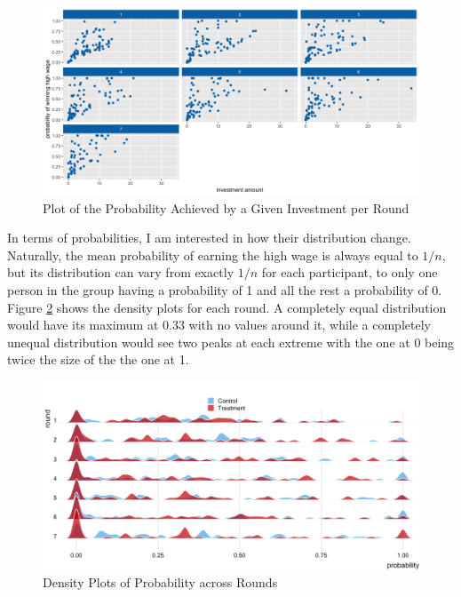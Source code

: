 \begin{figure}
    \centering
    \includegraphics[width=\textwidth]{graphs/invest_prob_point.png}
    \caption{Plot of the Probability Achieved by a Given Investment per Round}
    \label{fig:invest_prob_point}
\end{figure}

In terms of probabilities, I am interested in how their distribution change. Naturally, the mean probability of earning the high wage is always equal to $1/n$, but its distribution can vary from exactly $1/n$ for each participant, to only one person in the group having a probability of 1 and all the rest a probability of 0. Figure \ref{fig:dens_prob} shows the density plots for each round. A completely equal distribution would have its maximum at 0.33 with no values around it, while a completely unequal distribution would see two peaks at each extreme with the one at 0 being twice the size of the the one at 1.\\

\begin{figure}[H]
    \centering
    \includegraphics[width = \textwidth]{graphs/density_ridge_prob.png}
    \caption{Density Plots of Probability across Rounds}
    \label{fig:dens_prob}
\end{figure}

